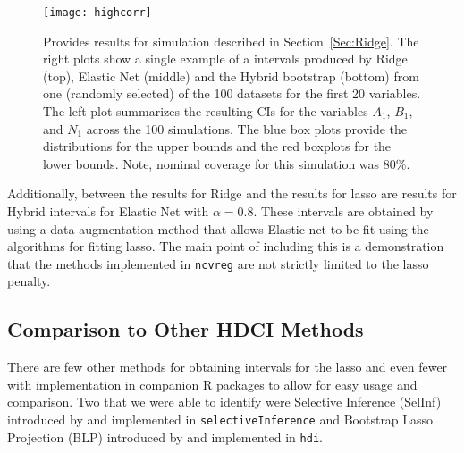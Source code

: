\begin{figure}[hbtp]
  \begin{center}
  \texttt{[image: highcorr]}
  \caption{\label{Fig:highcorr} Provides results for simulation described in Section~\ref{Sec:Ridge}. The right plots show a single example of a intervals produced by Ridge (top), Elastic Net (middle) and the Hybrid bootstrap (bottom) from one (randomly selected) of the 100 datasets for the first 20 variables. The left plot summarizes the resulting CIs for the variables $A_1$, $B_1$, and $N_1$ across the 100 simulations. The blue box plots provide the distributions for the upper bounds and the red boxplots for the lower bounds. Note, nominal coverage for this simulation was 80\%.}
  \end{center}
\end{figure}

Additionally, between the results for Ridge and the results for lasso are results for Hybrid intervals for Elastic Net with $\alpha = 0.8$. These intervals are obtained by using a data augmentation method that allows Elastic net to be fit using the algorithms for fitting lasso. The main point of including this is a demonstration that the methods implemented in \texttt{ncvreg} are not strictly limited to the lasso penalty.

\subsection{Comparison to Other HDCI Methods}\label{Sec:Comparison}

There are few other methods for obtaining intervals for the lasso and even fewer with implementation in companion R packages to allow for easy usage and comparison. Two that we were able to identify were Selective Inference (SelInf) introduced by \cite{LeeEtAl2016} and implemented in \texttt{selectiveInference} and Bootstrap Lasso Projection (BLP) introduced by \cite{Dezeure2017} and implemented in \texttt{hdi}.

